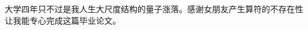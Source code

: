 \begin{acknowledgements}
	大学四年只不过是我人生大尺度结构的量子涨落。感谢女朋友产生算符的不存在性让我能专心完成这篇毕业论文。
\end{acknowledgements}
